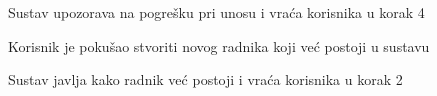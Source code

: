 \begin{packed_item}
\begin{packed_item}
\begin{packed_enum}
								\item Sustav upozorava na pogrešku pri unosu i vraća korisnika u korak 4
								
							\end{packed_enum}
							
							\item[5. a] Korisnik je pokušao stvoriti novog radnika koji već postoji u sustavu
							
								\item[] \begin{packed_enum}
								
								\item Sustav javlja kako radnik već postoji i vraća korisnika u korak 2\\\\\\\\
								
							\end{packed_enum}

							
						\end{packed_item}
					\end{packed_item}

